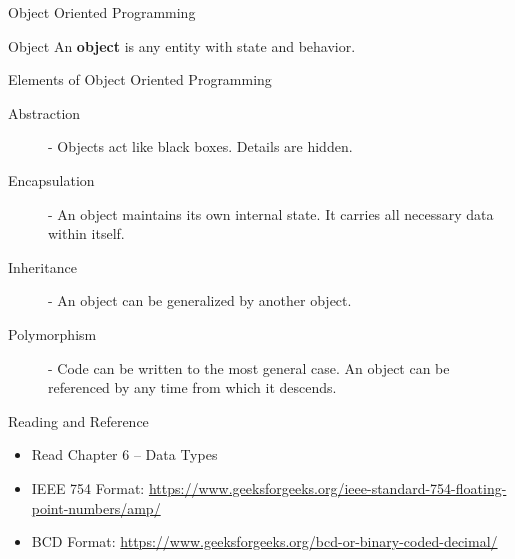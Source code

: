 \documentclass[handout]{beamer}
\begin{document}
\begin{frame}{Object Oriented Programming}
    \begin{block}{Object}
    An \textbf{object} is any entity with state and behavior. 
    \end{block}
    
    Elements of Object Oriented Programming
    \begin{description}
        \item[Abstraction] - Objects act like black boxes. Details are hidden.
        \item[Encapsulation] - An object maintains its own internal state. It carries all necessary data within itself.
        \item[Inheritance] - An object can be generalized by another object. 
        \item[Polymorphism] - Code can be written to the most general case. An object can be referenced by any time from which it descends.
    \end{description}
\end{frame}

\begin{frame}{Reading and Reference}
    \begin{itemize}
        \item Read Chapter 6 -- Data Types 
        \item IEEE 754 Format: \href{https://www.geeksforgeeks.org/ieee-standard-754-floating-point-numbers/amp/}{https://www.geeksforgeeks.org/ieee-standard-754-floating-point-numbers/amp/}
        \item BCD Format: \href{https://www.geeksforgeeks.org/bcd-or-binary-coded-decimal/}{https://www.geeksforgeeks.org/bcd-or-binary-coded-decimal/}
    \end{itemize}
\end{frame}
\end{document}
